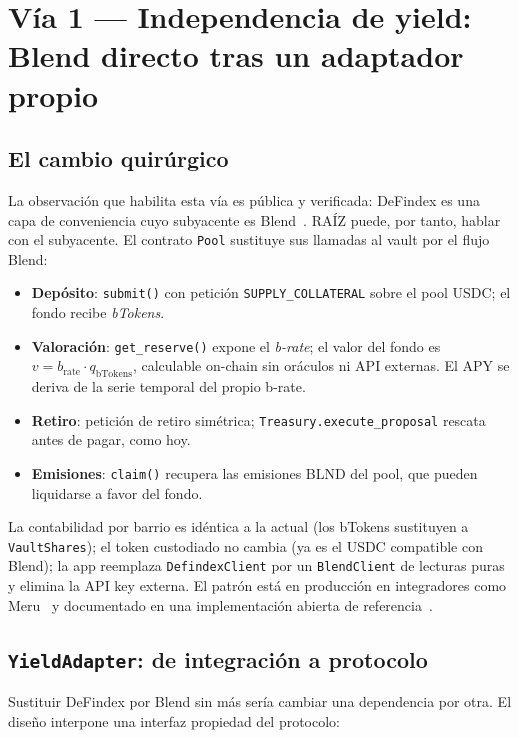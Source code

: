 \documentclass[twocolumn,10pt]{article}
\begin{document}
\section{V\'ia 1 --- Independencia de yield: Blend directo tras un adaptador propio}
\label{sec:via1}

\subsection{El cambio quir\'urgico}

La observaci\'on que habilita esta v\'ia es p\'ublica y verificada: DeFindex es una capa de conveniencia cuyo subyacente es Blend~\cite{composability}. RA\'IZ puede, por tanto, hablar con el subyacente. El contrato \texttt{Pool} sustituye sus llamadas al vault por el flujo Blend:

\begin{itemize}
\item \textbf{Dep\'osito}: \texttt{submit()} con petici\'on \texttt{SUPPLY\_COLLATERAL} sobre el pool USDC; el fondo recibe \emph{bTokens}.
\item \textbf{Valoraci\'on}: \texttt{get\_reserve()} expone el \emph{b-rate}; el valor del fondo es $v = b_{\mathrm{rate}} \cdot q_{\mathrm{bTokens}}$, calculable on-chain sin or\'aculos ni API externas. El APY se deriva de la serie temporal del propio b-rate.
\item \textbf{Retiro}: petici\'on de retiro sim\'etrica; \texttt{Treasury.execute\_proposal} rescata antes de pagar, como hoy.
\item \textbf{Emisiones}: \texttt{claim()} recupera las emisiones BLND del pool, que pueden liquidarse a favor del fondo.
\end{itemize}

La contabilidad por barrio es id\'entica a la actual (los bTokens sustituyen a \texttt{VaultShares}); el token custodiado no cambia (ya es el USDC compatible con Blend); la app reemplaza \texttt{DefindexClient} por un \texttt{BlendClient} de lecturas puras y elimina la API key externa. El patr\'on est\'a en producci\'on en integradores como Meru~\cite{meru} y documentado en una implementaci\'on abierta de referencia~\cite{blendvault}.

\subsection{\texttt{YieldAdapter}: de integraci\'on a protocolo}

Sustituir DeFindex por Blend sin m\'as ser\'ia cambiar una dependencia por otra. El dise\~no interpone una interfaz propiedad del protocolo:
\end{document}
